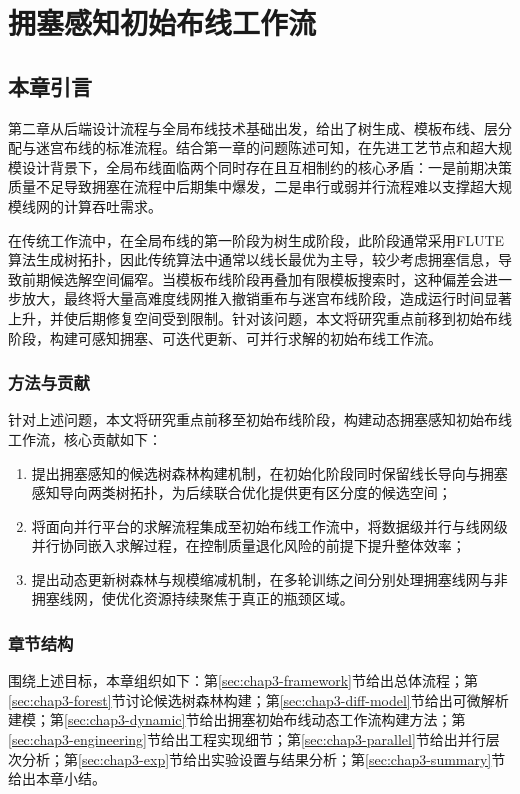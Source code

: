 \chapter{拥塞感知初始布线工作流}
\label{cha:congestion-aware-initial-routing}

\section{本章引言}
\label{sec:chap3-intro}

第二章从后端设计流程与全局布线技术基础出发，给出了树生成、模板布线、层分配与迷宫布线的标准流程。结合第一章的问题陈述可知，在先进工艺节点和超大规模设计背景下，全局布线面临两个同时存在且互相制约的核心矛盾：一是前期决策质量不足导致拥塞在流程中后期集中爆发，二是串行或弱并行流程难以支撑超大规模线网的计算吞吐需求。

在传统工作流中，在全局布线的第一阶段为树生成阶段，此阶段通常采用FLUTE算法生成树拓扑，因此传统算法中通常以线长最优为主导，较少考虑拥塞信息，导致前期候选解空间偏窄。当模板布线阶段再叠加有限模板搜索时，这种偏差会进一步放大，最终将大量高难度线网推入撤销重布与迷宫布线阶段，造成运行时间显著上升，并使后期修复空间受到限制。针对该问题，本文将研究重点前移到初始布线阶段，构建可感知拥塞、可迭代更新、可并行求解的初始布线工作流。

\subsection{方法与贡献}
针对上述问题，本文将研究重点前移至初始布线阶段，构建动态拥塞感知初始布线工作流，核心贡献如下：
\begin{enumerate}
    \item 提出拥塞感知的候选树森林构建机制，在初始化阶段同时保留线长导向与拥塞感知导向两类树拓扑，为后续联合优化提供更有区分度的候选空间；
    \item 将面向并行平台的求解流程集成至初始布线工作流中，将数据级并行与线网级并行协同嵌入求解过程，在控制质量退化风险的前提下提升整体效率；
    \item 提出动态更新树森林与规模缩减机制，在多轮训练之间分别处理拥塞线网与非拥塞线网，使优化资源持续聚焦于真正的瓶颈区域。
\end{enumerate}

\subsection{章节结构}
围绕上述目标，本章组织如下：第\ref{sec:chap3-framework}节给出总体流程；第\ref{sec:chap3-forest}节讨论候选树森林构建；第\ref{sec:chap3-diff-model}节给出可微解析建模；第\ref{sec:chap3-dynamic}节给出拥塞初始布线动态工作流构建方法；第\ref{sec:chap3-engineering}节给出工程实现细节；第\ref{sec:chap3-parallel}节给出并行层次分析；第\ref{sec:chap3-exp}节给出实验设置与结果分析；第\ref{sec:chap3-summary}节给出本章小结。


